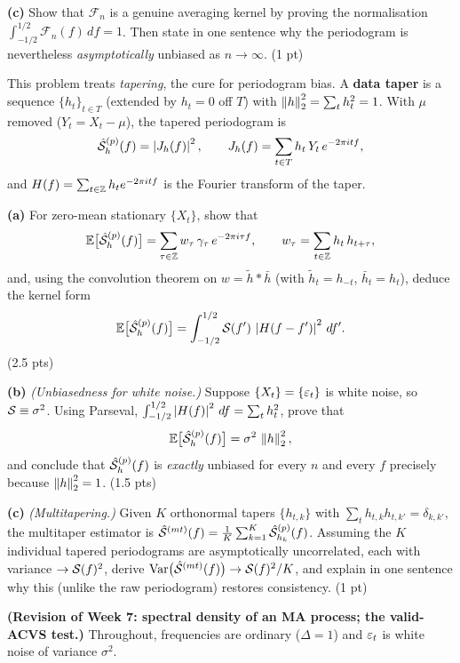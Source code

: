 \documentclass[11pt]{article}
\begin{document}
\textbf{(c)} Show that $\mathcal F_n$ is a genuine averaging kernel by proving the normalisation $\int_{-1/2}^{1/2}\mathcal F_n(f)\,df=1$. Then state in one sentence why the periodogram is nevertheless \emph{asymptotically} unbiased as $n\to\infty$. \hfill(1 pt)
\answerpage

This problem treats \emph{tapering}, the cure for periodogram bias. A \textbf{data taper} is a sequence $\{h_t\}_{t\in T}$ (extended by $h_t=0$ off $T$) with $\left\lVert h \right\rVert_2^2=\sum_t h_t^2=1$. With $\mu$ removed ($Y_t=X_t-\mu$), the tapered periodogram is
\[
\hat{\mathcal{S}}^{(p)}_h(f)=\left\lvert J_h(f) \right\rvert^2,\qquad J_h(f)=\sum_{t\in T} h_t\,Y_t\,e^{-2\pi i t f},
\]
and $H(f)=\sum_{t\in\mathbb{Z}} h_t e^{-2\pi i t f}$ is the Fourier transform of the taper.

\textbf{(a)} For zero-mean stationary $\{X_t\}$, show that
\[
\mathbb{E}\bigl[\hat{\mathcal{S}}^{(p)}_h(f)\bigr]=\sum_{\tau\in\mathbb{Z}} w_\tau\,\gamma_\tau\,e^{-2\pi i\tau f},
\qquad
w_\tau=\sum_{t\in\mathbb{Z}} h_t\,h_{t+\tau},
\]
and, using the convolution theorem on $w=\tilde h * \bar h$ (with $\tilde h_t=h_{-t}$, $\bar h_t=h_t$), deduce the kernel form
\[
\mathbb{E}\bigl[\hat{\mathcal{S}}^{(p)}_h(f)\bigr]=\int_{-1/2}^{1/2}\mathcal{S}(f')\,\left\lvert H(f-f') \right\rvert^2\,df'.
\]
\hfill(2.5 pts)

\textbf{(b)} \emph{(Unbiasedness for white noise.)} Suppose $\{X_t\}=\{\varepsilon_t\}$ is white noise, so $\mathcal{S}\equiv\sigma^2$. Using Parseval, $\int_{-1/2}^{1/2}\left\lvert H(f) \right\rvert^2\,df=\sum_t h_t^2$, prove that
\[
\mathbb{E}\bigl[\hat{\mathcal{S}}^{(p)}_h(f)\bigr]=\sigma^2\,\left\lVert h \right\rVert_2^2 ,
\]
and conclude that $\hat{\mathcal{S}}^{(p)}_h(f)$ is \emph{exactly} unbiased for every $n$ and every $f$ precisely because $\left\lVert h \right\rVert_2^2=1$. \hfill(1.5 pts)

\textbf{(c)} \emph{(Multitapering.)} Given $K$ orthonormal tapers $\{h_{t,k}\}$ with $\sum_t h_{t,k}h_{t,k'}=\delta_{k,k'}$, the multitaper estimator is $\hat{\mathcal{S}}^{(mt)}(f)=\frac1K\sum_{k=1}^{K}\hat{\mathcal{S}}^{(p)}_{h_k}(f)$. Assuming the $K$ individual tapered periodograms are asymptotically uncorrelated, each with variance $\to\mathcal{S}(f)^2$, derive $\operatorname{Var}\bigl(\hat{\mathcal{S}}^{(mt)}(f)\bigr)\to\mathcal{S}(f)^2/K$, and explain in one sentence why this (unlike the raw periodogram) restores consistency. \hfill(1 pt)
\answerpage

\textbf{(Revision of Week 7: spectral density of an MA process; the valid-ACVS test.)} Throughout, frequencies are ordinary ($\Delta=1$) and $\varepsilon_t$ is white noise of variance $\sigma^2$.
\end{document}
